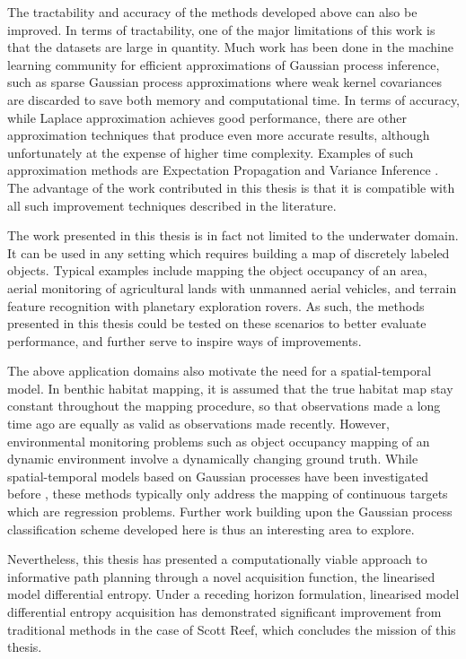 		The tractability and accuracy of the methods developed above can also be improved. In terms of tractability, one of the major limitations of this work is that the datasets are large in quantity. Much work has been done in the machine learning community for efficient approximations of Gaussian process inference, such as sparse Gaussian process approximations where weak kernel covariances are discarded to save both memory and computational time. In terms of accuracy, while Laplace approximation achieves good performance, there are other approximation techniques that produce even more accurate results, although unfortunately at the expense of higher time complexity. Examples of such approximation methods are Expectation Propagation and Variance Inference \citep{GaussianProcessForMachineLearning}. The advantage of the work contributed in this thesis is that it is compatible with all such improvement techniques described in the literature.
		
		The work presented in this thesis is in fact not limited to the underwater domain. It can be used in any setting which requires building a map of discretely labeled objects. Typical examples include mapping the object occupancy of an area, aerial monitoring of agricultural lands with unmanned aerial vehicles, and terrain feature recognition with planetary exploration rovers. As such, the methods presented in this thesis could be tested on these scenarios to better evaluate performance, and further serve to inspire ways of improvements.
		
		The above application domains also motivate the need for a spatial-temporal model. In benthic habitat mapping, it is assumed that the true habitat map stay constant throughout the mapping procedure, so that observations made a long time ago are equally as valid as observations made recently. However, environmental monitoring problems such as object occupancy mapping of an dynamic environment involve a dynamically changing ground truth. While spatial-temporal models based on Gaussian processes have been investigated before \citep{Roman:SequentialBayesianOptimisation}, these methods typically only address the mapping of continuous targets which are regression problems. Further work building upon the Gaussian process classification scheme developed here is thus an interesting area to explore.
		
		Nevertheless, this thesis has presented a computationally viable approach to informative path planning through a novel acquisition function, the linearised model differential entropy. Under a receding horizon formulation, linearised model differential entropy acquisition has demonstrated significant improvement from traditional methods in the case of Scott Reef, which concludes the mission of this thesis.

	
